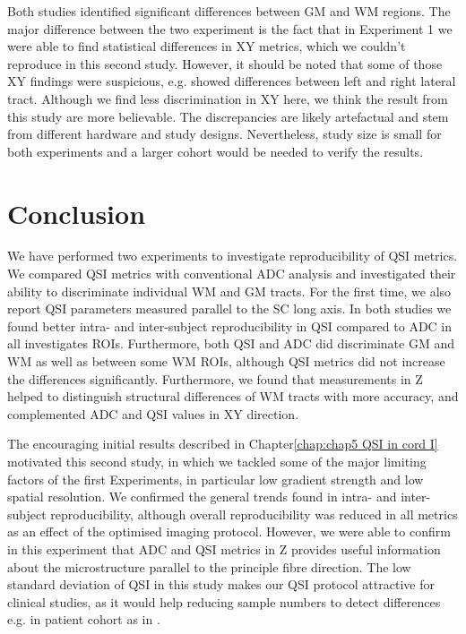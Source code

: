 Both studies identified significant differences between GM and WM regions. The major difference between the two experiment is the fact that in Experiment 1 we were able to find statistical differences in XY metrics, which we couldn't reproduce in this second study. However, it should be noted that some of those XY findings were suspicious, e.g. showed differences between left and right lateral tract. Although we find less discrimination in XY here, we think the result from this study are more believable. The discrepancies are likely artefactual and stem from different hardware and study designs. Nevertheless, study size is small for both experiments and a larger cohort would be needed to verify the results.
 
 

\section{Conclusion}
\label{par:chapter5 exp2 correlation}
We have performed two experiments to investigate reproducibility of QSI metrics. We compared QSI metrics with conventional ADC analysis and investigated their ability to discriminate individual WM and GM tracts. For the first time, we also report QSI parameters measured parallel to the \gls{SC} long axis. In both studies we found better intra- and inter-subject reproducibility in QSI compared to ADC in all investigates \glspl{ROI}. Furthermore, both QSI and ADC did discriminate GM and WM as well as between some WM \glspl{ROI}, although QSI metrics did not increase the differences significantly. Furthermore, we found that measurements in Z helped to distinguish structural differences of WM tracts with more accuracy, and complemented ADC and QSI values in XY direction.


The encouraging initial results described in Chapter\ref{chap:chap5 QSI in cord I} motivated this second study, in which we tackled some of the major limiting factors of the first Experiments, in particular low gradient strength and low spatial resolution. We confirmed the general trends found in intra- and inter-subject reproducibility, although overall reproducibility was reduced in all metrics as an effect of the optimised imaging protocol. However, we were able to confirm in this experiment that ADC and QSI metrics in Z provides useful information about the microstructure parallel to the principle fibre direction. The low standard deviation of QSI in this study makes our QSI protocol attractive for clinical studies, as it would help reducing sample numbers to detect differences e.g. in patient cohort as in \citep{Farrell:2008}.



